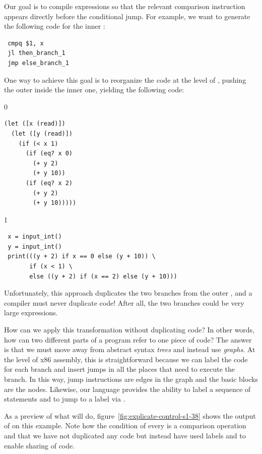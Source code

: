 \documentclass[7x10]{TimesAPriori_MIT}%
\def\racketEd{0}
\def\pythonEd{1}
\def\edition{1}
\newcommand{\pythonColor}[0]{}
\numberwithin{theorem}{chapter}
\numberwithin{definition}{chapter}
\numberwithin{equation}{chapter}
\begin{document}
Our goal is to compile  expressions so that the relevant
comparison instruction appears directly before the conditional jump.
For example, we want to generate the following code for the inner
:
\begin{center}
\begin{minipage}{0.96\textwidth}
\begin{lstlisting}
 cmpq $1, x
 jl then_branch_1
 jmp else_branch_1
\end{lstlisting}
\end{minipage}
\end{center}
One way to achieve this goal is to reorganize the code at the level of
\LangIf{}, pushing the outer  inside the inner one, yielding
the following code:
\begin{center}
\begin{minipage}{0.96\textwidth}
{\if\edition\racketEd        
\begin{lstlisting}
(let ([x (read)])
  (let ([y (read)])
    (if (< x 1) 
      (if (eq? x 0)
        (+ y 2)
        (+ y 10))
      (if (eq? x 2)
        (+ y 2)
        (+ y 10)))))
\end{lstlisting}
\fi}
{\if\edition\pythonEd\pythonColor
\begin{lstlisting}
 x = input_int()
 y = input_int()
 print(((y + 2) if x == 0 else (y + 10)) \
       if (x < 1) \
       else ((y + 2) if (x == 2) else (y + 10)))
\end{lstlisting}
\fi}
\end{minipage}
\end{center}
Unfortunately, this approach duplicates the two branches from the
outer , and a compiler must never duplicate code!  After all,
the two branches could be very large expressions.

How can we apply this transformation without duplicating code? In
other words, how can two different parts of a program refer to one
piece of code?
%
The answer is that we must move away from abstract syntax \emph{trees}
and instead use \emph{graphs}.
%
At the level of x86 assembly, this is straightforward because we can
label the code for each branch and insert jumps in all the places that
need to execute the branch. In this way, jump instructions are edges
in the graph and the basic blocks are the nodes.
%
Likewise, our language \LangCIf{} provides the ability to label a
sequence of statements and to jump to a label via .

As a preview of what  will do,
figure~\ref{fig:explicate-control-s1-38} shows the output of
\code{explicate\_control} on this example. Note how the condition of
every \code{if} is a comparison operation and that we have not
duplicated any code but instead have used labels and \code{goto} to
enable sharing of code.
\end{document}
